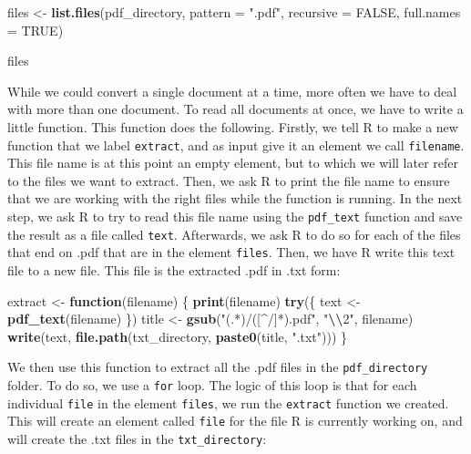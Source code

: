 \documentclass[
]{book}
\newenvironment{Shaded}{\begin{snugshade}}{\end{snugshade}}
\newcommand{\AttributeTok}[1]{\textcolor[rgb]{0.13,0.29,0.53}{#1}}
\newcommand{\ConstantTok}[1]{\textcolor[rgb]{0.56,0.35,0.01}{#1}}
\newcommand{\ControlFlowTok}[1]{\textcolor[rgb]{0.13,0.29,0.53}{\textbf{#1}}}
\newcommand{\FunctionTok}[1]{\textcolor[rgb]{0.13,0.29,0.53}{\textbf{#1}}}
\newcommand{\NormalTok}[1]{#1}
\newcommand{\OtherTok}[1]{\textcolor[rgb]{0.56,0.35,0.01}{#1}}
\newcommand{\SpecialCharTok}[1]{\textcolor[rgb]{0.81,0.36,0.00}{\textbf{#1}}}
\newcommand{\StringTok}[1]{\textcolor[rgb]{0.31,0.60,0.02}{#1}}
\begin{document}
\begin{Shaded}
\begin{Highlighting}[]
\NormalTok{files }\OtherTok{\textless{}{-}} \FunctionTok{list.files}\NormalTok{(pdf\_directory, }\AttributeTok{pattern =} \StringTok{".pdf"}\NormalTok{, }\AttributeTok{recursive =} \ConstantTok{FALSE}\NormalTok{, }\AttributeTok{full.names =} \ConstantTok{TRUE}\NormalTok{)}

\NormalTok{files}
\end{Highlighting}
\end{Shaded}

While we could convert a single document at a time, more often we have to deal with more than one document. To read all documents at once, we have to write a little function. This function does the following. Firstly, we tell R to make a new function that we label \texttt{extract}, and as input give it an element we call \texttt{filename}. This file name is at this point an empty element, but to which we will later refer to the files we want to extract. Then, we ask R to print the file name to ensure that we are working with the right files while the function is running. In the next step, we ask R to try to read this file name using the \texttt{pdf\_text} function and save the result as a file called \texttt{text}. Afterwards, we ask R to do so for each of the files that end on .pdf that are in the element \texttt{files}. Then, we have R write this text file to a new file. This file is the extracted .pdf in .txt form:

\begin{Shaded}
\begin{Highlighting}[]
\NormalTok{extract }\OtherTok{\textless{}{-}} \ControlFlowTok{function}\NormalTok{(filename) \{}
  \FunctionTok{print}\NormalTok{(filename)}
  \FunctionTok{try}\NormalTok{(\{}
\NormalTok{    text }\OtherTok{\textless{}{-}} \FunctionTok{pdf\_text}\NormalTok{(filename)}
\NormalTok{  \})}
\NormalTok{  title }\OtherTok{\textless{}{-}} \FunctionTok{gsub}\NormalTok{(}\StringTok{"(.*)/([\^{}/]*).pdf"}\NormalTok{, }\StringTok{"}\SpecialCharTok{\textbackslash{}\textbackslash{}}\StringTok{2"}\NormalTok{, filename)}
  \FunctionTok{write}\NormalTok{(text, }\FunctionTok{file.path}\NormalTok{(txt\_directory, }\FunctionTok{paste0}\NormalTok{(title, }\StringTok{".txt"}\NormalTok{)))}
\NormalTok{\}}
\end{Highlighting}
\end{Shaded}

We then use this function to extract all the .pdf files in the \texttt{pdf\_directory} folder. To do so, we use a \texttt{for} loop. The logic of this loop is that for each individual \texttt{file} in the element \texttt{files}, we run the \texttt{extract} function we created. This will create an element called \texttt{file} for the file R is currently working on, and will create the .txt files in the \texttt{txt\_directory}:
\end{document}
